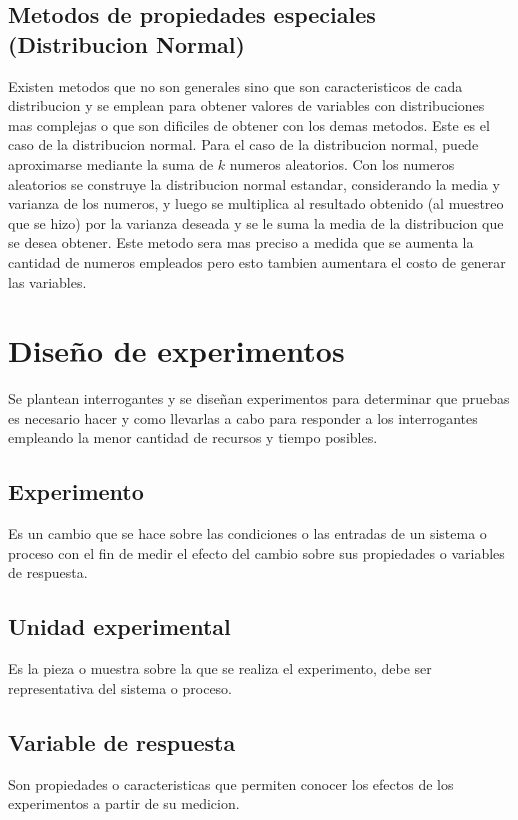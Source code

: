 \documentclass[a4paper]{article}
\begin{document}
\subsection*{Metodos de propiedades especiales (Distribucion Normal)}
Existen metodos que no son generales sino que son caracteristicos de cada distribucion y se emplean para obtener valores 
de variables con distribuciones mas complejas o que son dificiles de obtener con los demas metodos.
Este es el caso de la distribucion normal. Para el caso de la distribucion normal, puede aproximarse mediante la suma
de $k$ numeros aleatorios. Con los numeros aleatorios se construye la distribucion normal estandar, considerando la media 
y varianza de los numeros, y luego se multiplica al resultado obtenido (al muestreo que se hizo) por la varianza deseada y
se le suma la media de la distribucion que se desea obtener. Este metodo sera mas preciso a medida que se aumenta la 
cantidad de numeros empleados pero esto tambien aumentara el costo de generar las variables.

\section*{Diseño de experimentos}
Se plantean interrogantes y se diseñan experimentos para determinar que pruebas es necesario hacer y como llevarlas a cabo para responder
a los interrogantes empleando la menor cantidad de recursos y tiempo posibles.

\subsection*{Experimento}
Es un cambio que se hace sobre las condiciones o las entradas de un sistema o proceso con el fin de medir el efecto del cambio sobre 
sus propiedades o variables de respuesta.

\subsection*{Unidad experimental}
Es la pieza o muestra sobre la que se realiza el experimento, debe ser representativa del sistema o proceso.

\subsection*{Variable de respuesta}
Son propiedades o caracteristicas que permiten conocer los efectos de los experimentos a partir de su medicion.
\end{document}
